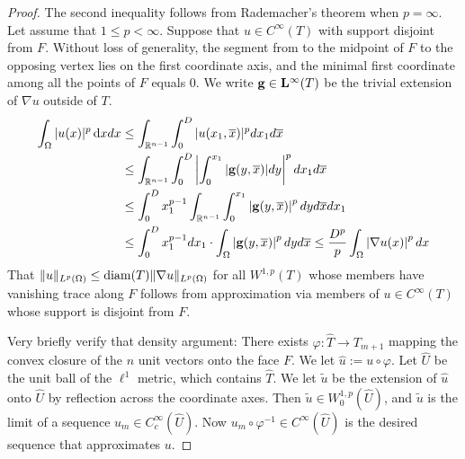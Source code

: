 \documentclass[12pt,a4paper]{article}
\begin{document}
\begin{proof}
    The second inequality follows from Rademacher's theorem when $p = \infty$.
    Let assume that $1 \leq p < \infty$. 
    Suppose that $u \in C^{\infty}(T)$ with support disjoint from $F$.
    Without loss of generality, 
    the segment from to the midpoint of $F$ to the opposing vertex lies on the first coordinate axis,
    and the minimal first coordinate among all the points of $F$ equals $0$. 
    We write ${\mathbf g} \in {\mathbf L}^{\infty}(T)$ be the trivial extension of $\nabla u$ outside of $T$.
    \begin{align*}
        \int_{\Omega} |u(x)|^{p} \mathop{}\!\mathrm{d} x dx
        &\leq
        \int_{{\mathbb R}^{n-1}} \int_{0}^{D} |u( x_{1}, \overline x )|^{p} dx_{1} d\overline{x}
        \\&
        \leq
        \int_{{\mathbb R}^{n-1}} \int_{0}^{D} \left| \int_{0}^{x_{1}} |{\mathbf g}( y, \overline x )| dy \right|^{p} dx_{1} d\overline{x}
        \\&
        \leq
        \int_{0}^{D} x_{1}^{p-1} \int_{{\mathbb R}^{n-1}} \int_{0}^{x_{1}} \left| {\mathbf g}( y, \overline x ) \right|^{p} dy d\overline{x} dx_{1}
        \\&
        \leq
        \int_{0}^{D} x_{1}^{p-1} dx_1 \cdot \int_{\Omega} \left| {\mathbf g}( y, \overline x ) \right|^{p} dy d\overline{x} 
        \leq
        \frac{D^{p}}{p} \int_{\Omega} \left| \nabla u( x ) \right|^{p} dx
    \end{align*}
    That $\|u\|_{L^{p}(\Omega)} \leq {\operatorname{diam}}(T) \|\nabla u\|_{L^{p}(\Omega)}$ for all $W^{1,p}(T)$ whose members have vanishing trace along $F$ follows from approximation via members of $u \in C^{\infty}(T)$ whose support is disjoint from $F$. 
    
    Very briefly verify that density argument: 
    There exists $\varphi : \hat T \rightarrow T_{m+1}$ mapping the convex closure of the $n$ unit vectors onto the face $F$.
    We let $\hat u := u \circ \varphi$.
    Let $\hat U$ be the unit ball of the $\ell^1$ metric, which contains $\hat T$.
    We let $\tilde u$ be the extension of $\hat u$ onto $\hat U$ by reflection across the coordinate axes.
    Then $\tilde u \in W^{1,p}_{0}(\hat U)$, and $\tilde u$ is the limit of a sequence $u_{m} \in C^{\infty}_{c}(\hat U)$.
    Now $u_{m} \circ \varphi^{-1} \in C^{\infty}(\hat U)$ is the desired sequence that approximates $u$. 
\end{proof}
\end{document}
